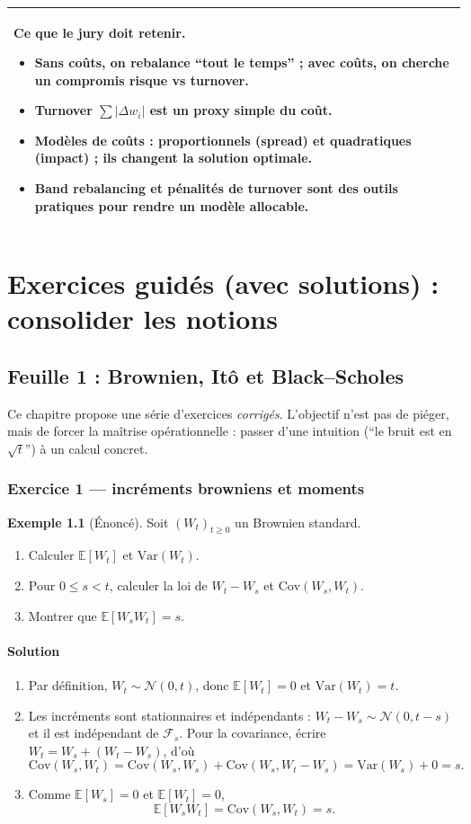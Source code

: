 \documentclass[11pt,a4paper]{report}
\newcommand{\E}{\mathbb{E}}
\newcommand{\Var}{\mathrm{Var}}
\newcommand{\Cov}{\mathrm{Cov}}
\newcommand{\1}{\mathbbm{1}}
\newcommand{\Normal}{\mathcal{N}}
\newcommand{\F}{\mathcal{F}}
\newcommand{\abs}[1]{\left|#1\right|}
\theoremstyle{definition}
\newtheorem{example}{Exemple}[chapter]
\theoremstyle{plain}
\theoremstyle{remark}
\newenvironment{jurybox}{%
  \begin{center}
  \setlength{\tabcolsep}{6pt}%
  \renewcommand{\arraystretch}{1.1}%
  \begin{tabular}{|p{0.94\textwidth}|}
  \hline
  \small\textbf{Ce que le jury doit retenir.}\par\medskip
}{%
  \\ \hline
  \end{tabular}
  \end{center}
}
\begin{document}
\begin{jurybox}
\begin{itemize}
\item Sans coûts, on rebalance ``tout le temps'' ; avec coûts, on cherche un compromis risque vs turnover.
\item Turnover $\sum \abs{\Delta w_i}$ est un proxy simple du coût.
\item Modèles de coûts : proportionnels (spread) et quadratiques (impact) ; ils changent la solution optimale.
\item Band rebalancing et pénalités de turnover sont des outils pratiques pour rendre un modèle allocable.
\end{itemize}
\end{jurybox}

\part{Exercices guidés (avec solutions) : consolider les notions}

\chapter{Feuille 1 : Brownien, Itô et Black--Scholes}
\label{chap:td1}

Ce chapitre propose une série d'exercices \emph{corrigés}.
L'objectif n'est pas de piéger, mais de forcer la maîtrise opérationnelle :
passer d'une intuition (``le bruit est en $\sqrt{t}$'') à un calcul concret.

\section{Exercice 1 --- incréments browniens et moments}
\begin{example}[Énoncé]
Soit $(W_t)_{t\ge 0}$ un Brownien standard.
\begin{enumerate}[label=\alph*)]
  \item Calculer $\E[W_t]$ et $\Var(W_t)$.
  \item Pour $0\le s<t$, calculer la loi de $W_t-W_s$ et $\Cov(W_s, W_t)$.
  \item Montrer que $\E[W_s W_t]=s$.
\end{enumerate}
\end{example}

\subsection*{Solution}
\begin{enumerate}[label=\alph*)]
  \item Par définition, $W_t\sim \Normal(0,t)$, donc $\E[W_t]=0$ et $\Var(W_t)=t$.
  \item Les incréments sont stationnaires et indépendants : $W_t-W_s\sim \Normal(0,t-s)$ et il est indépendant de $\F_s$.
  Pour la covariance, écrire $W_t=W_s+(W_t-W_s)$, d'où
  \[\Cov(W_s,W_t)=\Cov(W_s, W_s)+\Cov(W_s, W_t-W_s)=\Var(W_s)+0=s.\]
  \item Comme $\E[W_s]=0$ et $\E[W_t]=0$,
  \[\E[W_s W_t]=\Cov(W_s,W_t)=s.\]
\end{enumerate}
\end{document}
